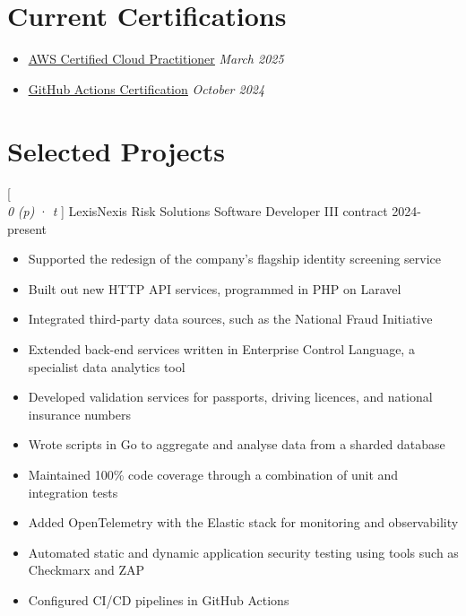 \documentclass[a4paper,10pt]{article}
\newcommand{\link}[2]{
  \textcolor{link}{\uline{\href{#1}{#2}}}
}
\newcommand{\resumeHeading}[1]{
  \section*{#1}
}
\newcommand{\resumeSubheading}[5][12pt]{
  \vspace{#1}
  {\scshape{#2}} \\
  \textit{\small{#3}} \textit{\small{(#4)}} · \textit{\small{#5}}
  \vspace{2pt}
}
\newcommand{\resumeListStart}{\begin{itemize}}
\newcommand{\resumeListEnd}{\end{itemize}}
\newcommand{\resumeItem}[1]{
  \item[\-·]\small{{#1\vspace{1pt}}}
}
\begin{document}
  \begin{minipage}{\textwidth}
    \resumeHeading{Current Certifications}

    \resumeListStart
      \resumeItem{\link{https://www.credly.com/badges/9801eabb-75e4-4533-a63b-4560c0abae49/}{AWS Certified Cloud Practitioner} \hfill \textit{March 2025}}
      \resumeItem{\link{https://www.credly.com/badges/4ffff536-6b68-40b1-8686-5ffd7f548447/}{GitHub Actions Certification} \hfill \textit{October 2024}}
    \resumeListEnd
  \end{minipage}

  \begin{minipage}{\textwidth}
    \resumeHeading{Selected Projects}

    \resumeSubheading
      [0pt]  %
      {LexisNexis Risk Solutions}
      {Software Developer III}
      {contract}
      {2024-present}
    \resumeListStart
      \resumeItem{Supported the redesign of the company's flagship identity screening service}
      \resumeItem{Built out new HTTP API services, programmed in PHP on Laravel}
      \resumeItem{Integrated third-party data sources, such as the National Fraud Initiative}
      \resumeItem{Extended back-end services written in Enterprise Control Language, a specialist data analytics tool}
      \resumeItem{Developed validation services for passports, driving licences, and national insurance numbers}
      \resumeItem{Wrote scripts in Go to aggregate and analyse data from a sharded database}
      \resumeItem{Maintained 100\% code coverage through a combination of unit and integration tests}
      \resumeItem{Added OpenTelemetry with the Elastic stack for monitoring and observability}
      \resumeItem{Automated static and dynamic application security testing using tools such as Checkmarx and ZAP}
      \resumeItem{Configured CI/CD pipelines in GitHub Actions}
    \resumeListEnd
  \end{minipage}

\end{document}
